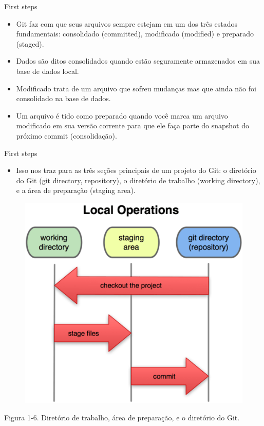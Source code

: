 \documentclass[t]{beamer}
\begin{document}
\begin{frame} {First steps}
	\begin{itemize}
		\item Git faz com que seus arquivos sempre estejam em um dos três estados fundamentais: consolidado (committed), modificado (modified) e preparado (staged). 
		\item Dados são ditos consolidados quando estão seguramente armazenados em sua base de dados local. 
		\item Modificado trata de um arquivo que sofreu mudanças mas que ainda não foi consolidado na base de dados.
		\item Um arquivo é tido como preparado quando você marca um arquivo modificado em sua versão corrente para que ele faça parte do snapshot do próximo commit (consolidação).
	\end{itemize}
\end{frame}	

\begin{frame} {First steps}
	\begin{itemize}
		\item Isso nos traz para as três seções principais de um projeto do Git: o diretório do Git (git directory, repository), o diretório de trabalho (working directory), e a área de preparação (staging area).
	\end{itemize}

  		\begin{figure}[tb!]
  			\centering
  			\includegraphics[scale=0.2,keepaspectratio=true]{diretorio.png}
  		\end{figure}
	Figura 1-6. Diretório de trabalho, área de preparação, e o diretório do Git.
	
	
\end{frame}	
\end{document}

